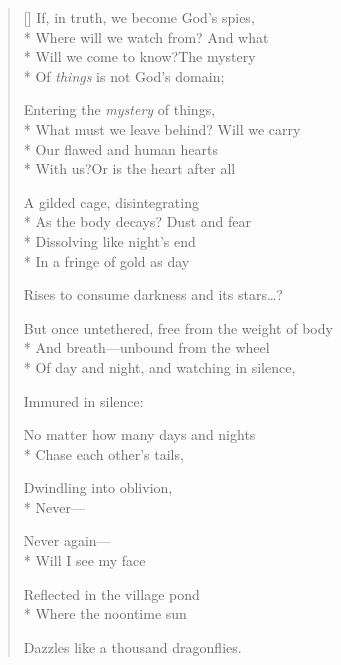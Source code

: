 \label{ch:lear_bl}
\settowidth{\versewidth}{But once untethered, free from the weight of body}
\begin{verse}[\versewidth]
 If, in truth, we become God's spies,\\*
Where will we watch from?   And what\\*
Will we come to know?\qquad The mystery\\*
Of \textit{things} is not God's domain;

Entering the \textit{mystery} of things,\\*
What must we leave behind?  Will we carry\\*
Our flawed and human hearts\\*
With us?\qquad Or is the heart after all

A gilded cage, disintegrating\\*
As the body decays?   Dust and fear\\*
Dissolving like night's end\\*
In a fringe of gold as day

Rises to consume darkness and its stars\ldots{}?

But once untethered, free from the weight of body\\*
And breath---unbound from the wheel\\*
Of day and night, and watching in silence,

Immured in silence:

No matter how many days and nights\\*
Chase each other's tails,

Dwindling into oblivion,\\*
Never---

Never again---\\*
Will I see my face

Reflected in the village pond\\*
Where the noontime sun

Dazzles like a thousand dragonflies.
\end{verse}
